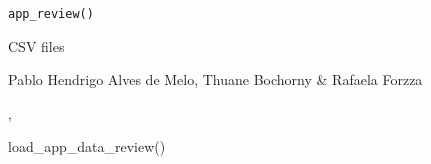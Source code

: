 \documentclass[a4paper]{book}
\begin{document}
%
\begin{Usage}
\begin{verbatim}
app_review()
\end{verbatim}
\end{Usage}
%
\begin{Value}
CSV files
\end{Value}
%
\begin{Author}
Pablo Hendrigo Alves de Melo,
Thuane Bochorny \&
Rafaela Forzza
\end{Author}
%
\begin{SeeAlso}
, 
\end{SeeAlso}
%
\begin{Examples}
\begin{ExampleCode}

load_app_data_review()

\end{ExampleCode}
\end{Examples}
\printindex{}
\end{document}
